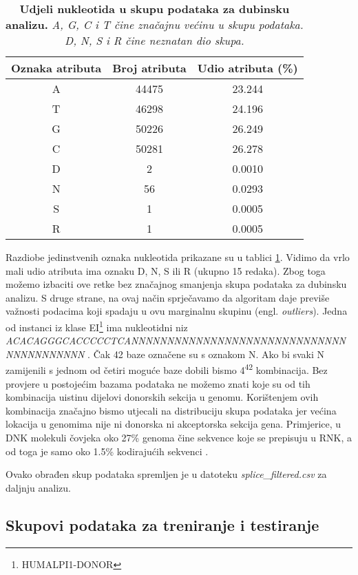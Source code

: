 \begin{table}[!ht]
   \caption[Udjeli nukleotida u skupu podataka za dubinsku analizu]{
   \textbf{Udjeli nukleotida u skupu podataka za dubinsku analizu.} \textit{A, G, C i T čine značajnu većinu u skupu podataka. D, N, S i R čine neznatan dio skupa.}}
   \centering
   \begin{tabular}{||c | c | c ||}
   \hline
   Oznaka atributa & Broj atributa & Udio atributa (\%) \\ [0.5ex]
   \hline\hline
   A & 44475 & 23.244 \\
   T & 46298 & 24.196 \\
   G & 50226 & 26.249 \\
   C & 50281 & 26.278 \\
   D & 2  & 0.0010 \\
   N & 56 & 0.0293 \\
   S & 1  & 0.0005 \\
   R & 1  & 0.0005 \\ [1ex]
   \hline
   \end{tabular}
   \label{tab:udjeli}
\end{table}
Razdiobe jedinstvenih oznaka nukleotida prikazane su u tablici \ref{tab:udjeli}. Vidimo da vrlo mali udio atributa ima oznaku D, N, S ili R (ukupno 15 redaka). Zbog toga možemo izbaciti ove retke bez značajnog smanjenja skupa podataka za dubinsku analizu. S druge strane, na ovaj način sprječavamo da algoritam daje previše važnosti podacima koji spadaju u ovu marginalnu skupinu (engl. \textit{outliers}). 
Jedna od instanci iz klase EI\footnote{HUMALPI1-DONOR} ima nukleotidni niz\textit{ 
ACACAGGGCACCCCCTCANNNNNNNNNNNNNNNNNNNNNNNNNNNNNNNNNNNNNNNNN
}. Čak 42 baze označene su s oznakom N. Ako bi svaki N zamijenili s jednom od četiri moguće baze dobili bismo 4\textsuperscript{42} kombinacija. Bez provjere u postojećim bazama podataka ne možemo znati koje su od tih kombinacija uistinu dijelovi donorskih sekcija u genomu. Korištenjem ovih kombinacija značajno bismo utjecali na distribuciju skupa podataka jer većina lokacija u genomima nije ni donorska ni akceptorska sekcija gena. Primjerice, u DNK molekuli čovjeka oko 27\% genoma čine sekvence koje se prepisuju u RNK, a od toga je samo oko 1.5\% kodirajućih sekvenci \cite{Berg01}.

Ovako obrađen skup podataka spremljen je u datoteku \textit{splice\_filtered.csv} za daljnju analizu.

\subsection{Skupovi podataka za treniranje i testiranje}

